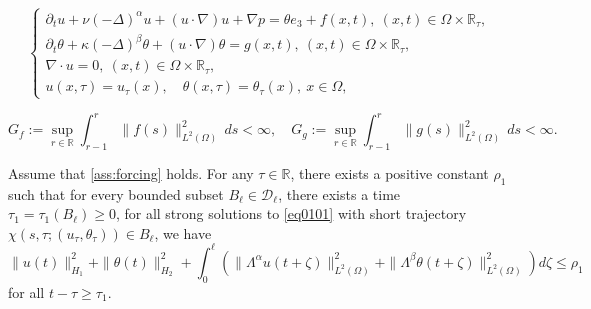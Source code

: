 \documentclass[10pt,a4paper]{amsart}
\begin{document}
\begin{equation}\label{eq0101}
\begin{cases}
\partial_{t}u+\nu(-\Delta)^{\alpha}u+(u\cdot\nabla)u+\nabla p = \theta e_3 + f(x,t),\ (x,t)\in \Omega \times \mathbb{R}_{\tau}, \\
\partial_{t}\theta+\kappa(-\Delta)^{\beta}\theta+(u\cdot\nabla)\theta = g(x,t),\ (x,t)\in \Omega \times \mathbb{R}_{\tau}, \\
\nabla\cdot u = 0,\ (x,t)\in \Omega \times \mathbb{R}_{\tau},  \\
u(x,\tau) = u_\tau(x), \quad \theta(x,\tau) = \theta_\tau(x),\ x \in \Omega, 
\end{cases}
\end{equation}

\begin{equation}\label{ass:forcing}
G_f := \sup_{r\in\mathbb{R}}
\int_{r-1}^{r}\|f(s)\|_{L^2(\Omega)}^2\,ds < \infty, \quad
G_g := \sup_{r\in\mathbb{R}}
\int_{r-1}^{r}\|g(s)\|_{L^2(\Omega)}^2\,ds < \infty.
\end{equation}

\begin{lemma}\label{lem0301}
Assume that \cref{ass:forcing} holds. For any $\tau \in \mathbb{R}$, there exists a positive constant $\rho_1$ such that for every bounded subset $B_{\ell} \in \mathcal{D}_{\ell}$, there exists a time $\tau_1 =\tau_1(B_{\ell}) \geq 0 $, for all strong solutions to \cref{eq0101} with short trajectory $\chi(s,\tau; (u_\tau, \theta_\tau)) \in B_{\ell}$, we have 
\[
\| u(t) \|_{H_{1}}^{2}
+ \| \theta(t) \|_{H_{2}}^{2}
+ \int_{0}^{\ell} \left(
\| \Lambda^\alpha u(t+\zeta)\|_{L^2(\Omega)}^2 + \| \Lambda^\beta \theta(t+\zeta)\|_{L^2(\Omega)}^2 \right) d\zeta
\leq \rho_1 
\]
for all $t-\tau \geq \tau_1$.
\end{lemma}
\end{document}
